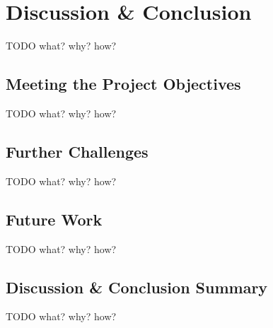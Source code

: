 
\chapter{Discussion \& Conclusion}
TODO what? why? how?
\section{Meeting the Project Objectives}
TODO what? why? how?
\section{Further Challenges}
TODO what? why? how?
\section{Future Work}
TODO what? why? how?
\section{Discussion \& Conclusion Summary}
TODO what? why? how?